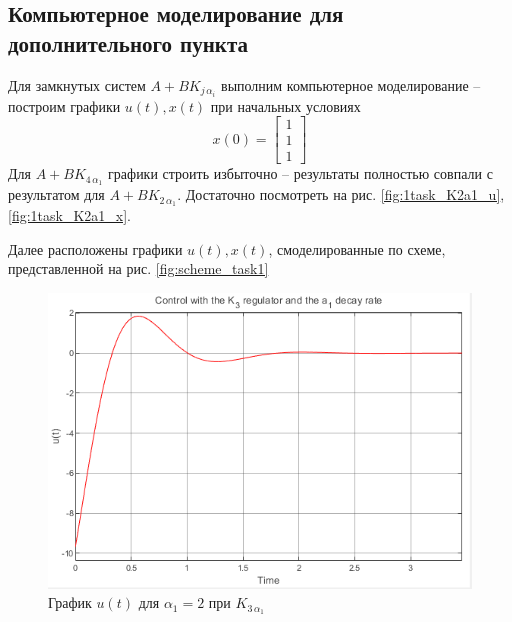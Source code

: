 \documentclass[a4paper, 12pt]{article}
\begin{document}
    \subsection{Компьютерное моделирование для дополнительного пункта}
    Для замкнутых систем $A+BK_{j\,\alpha_i}$ выполним компьютерное моделирование -- построим
    графики $u(t),x(t)$ при начальных условиях $$x(0)=\begin{bmatrix}
        1\\1\\1
    \end{bmatrix}$$
    Для $A+BK_{4\,\alpha_1}$ графики строить избыточно -- результаты полностью совпали с результатом для $A+BK_{2\,\alpha_1}$.
    Достаточно посмотреть на рис. \ref{fig:1task_K2a1_u}, \ref{fig:1task_K2a1_x}.


    Далее расположены графики $u(t),x(t)$, смоделированные по схеме, представленной на рис. \ref{fig:scheme_task1}
    \newpage
    \vspace*{0.01mm}
    \begin{figure}[H]
        \centering
        \includegraphics{1task_K3a1_u.png}
        \captionsetup{skip=0pt}
        \caption{График $u(t)$ для $\alpha_1=2$ при $K_{3\,\alpha_1}$}
        \label{fig:1task_K3a1_u}
    \end{figure}
\end{document}
